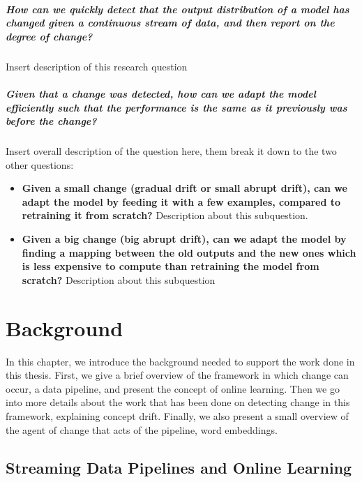 \documentclass[12pt]{extreport}
\begin{document}
\paragraph*{How can we quickly detect that the output distribution of a model has changed given a continuous stream of data, and then report on the degree of change?} Insert description of this research question

\paragraph*{Given that a change was detected, how can we adapt the model efficiently such that the performance is the same as it previously was before the change?} Insert overall description of the question here, them break it down to the two other questions:
\begin{itemize}
    \item \textbf{Given a small change (gradual drift or small abrupt drift), can we adapt the model by feeding it with a few examples, compared to retraining it from scratch?} Description about this subquestion.
    \item \textbf{Given a big change (big abrupt drift), can we adapt the model by finding a mapping between the old outputs and the new ones which is less expensive to compute than retraining the model from scratch?} Description about this subquestion
\end{itemize}

\chapter{Background}

In this chapter, we introduce the background needed to support the work done in this thesis. First, we give a brief overview of the framework in which change can occur, a data pipeline, and present the concept of online learning. Then we go into more details about the work that has been done on detecting change in this framework, explaining concept drift. Finally, we also present a small overview of the agent of change that acts of the pipeline, word embeddings.

\section{Streaming Data Pipelines and Online Learning}
\end{document}
